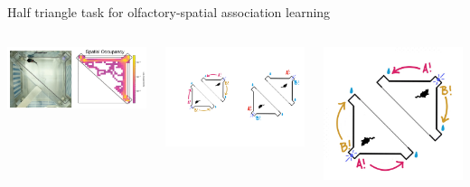 \documentclass[bigger]{beamer}
\begin{document}
\begin{frame}[label={sec:org2840a5c}]{Half triangle task for olfactory-spatial association learning}
\begin{columns}
\begin{column}[c]{0.33\columnwidth}
\includegraphics[width=\linewidth, keepaspectratio, trim={0cm 0cm 28cm 0cm}, clip]{img/video-picture.png}
\end{column}
\begin{column}[c]{0.33\columnwidth}
\includegraphics[width=0.9\linewidth, keepaspectratio, trim={11cm 18cm 40cm 13cm}, clip]{img/task-east-west.png}
\end{column}
\begin{column}[c]{0.33\columnwidth}
\includegraphics[width=0.9\linewidth, keepaspectratio, trim={3cm 2cm 4cm 4cm}, clip]{img/task-left-right.jpeg}

\end{column}
\end{columns}
\end{frame}
\end{document}
